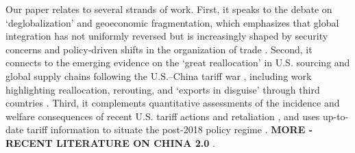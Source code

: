 \documentclass[english,12pt]{article}
\theoremstyle{definition}
\begin{document}

Our paper relates to several strands of work. First, it speaks to the debate
on `deglobalization' and geoeconomic fragmentation, which emphasizes that
global integration has not uniformly reversed but is increasingly shaped by
security concerns and policy-driven shifts in the organization of trade %
\citep{Antras2021DeglobalisationECB,goldberg2023global,AiyarPresbiteroRuta2023GEFBook}%
. Second, it connects to the emerging evidence on the `great reallocation'
in U.S. sourcing and global supply chains following the U.S.--China tariff
war %
\citep{AlfaroChor2023JacksonHoleGreatReallocation,AlfaroChor2025AnatomyGreatReallocation}%
, including work highlighting reallocation, rerouting, and `exports in disguise' through
third countries \citep{MaleskyEtAl2024ExportsInDisguise,gopinath2025changing,Schulze2025}. Third, it complements quantitative assessments of the incidence and
welfare consequences of recent U.S. tariff actions and retaliation %
\citep{AmitiReddingWeinstein2019JEP,FajgelbaumEtAl2020Return,CavalloEtAl2021TariffPassThrough,FlaaenHortacsuTintelnot2020WashingMachines}%
, and uses up-to-date tariff information to situate the post-2018 policy
regime \citep{Bown2025USChinaTariffsChart}. \textbf{MORE - RECENT LITERATURE ON CHINA 2.0}
.
\end{document}
